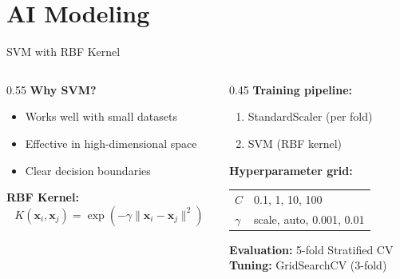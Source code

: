 \documentclass[aspectratio=169]{beamer}
\begin{document}
\section{AI Modeling}
\begin{frame}{SVM with RBF Kernel}
\begin{columns}
\begin{column}{0.55\textwidth}
\textbf{Why SVM?}
\begin{itemize}
    \item Works well with small datasets
    \item Effective in high-dimensional space
    \item Clear decision boundaries
\end{itemize}

\vspace{0.3cm}
\textbf{RBF Kernel:}
$$K(\mathbf{x}_i, \mathbf{x}_j) = \exp\left(-\gamma \|\mathbf{x}_i - \mathbf{x}_j\|^2\right)$$
\end{column}
\begin{column}{0.45\textwidth}
\textbf{Training pipeline:}
\begin{enumerate}
    \item StandardScaler (per fold)
    \item SVM (RBF kernel)
\end{enumerate}

\vspace{0.2cm}
\textbf{Hyperparameter grid:}
\begin{table}
\centering
\begin{tabular}{ll}
\toprule
$C$ & 0.1, 1, 10, 100 \\
$\gamma$ & scale, auto, 0.001, 0.01 \\
\bottomrule
\end{tabular}
\end{table}

\vspace{0.1cm}
\textbf{Evaluation:} 5-fold Stratified CV\\
\textbf{Tuning:} GridSearchCV (3-fold)
\end{column}
\end{columns}
\end{frame}

\end{document}
